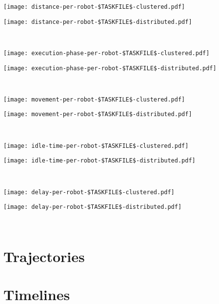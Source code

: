 \documentclass[11pt,a4paper]{article}
\begin{document}
\newpage

\noindent
\begin{minipage}{0.5\textwidth}
\texttt{[image: distance-per-robot-\$TASKFILE\$-clustered.pdf]}
\end{minipage}
\begin{minipage}{0.5\textwidth}
\texttt{[image: distance-per-robot-\$TASKFILE\$-distributed.pdf]}
\end{minipage}
\\[0.5cm]

\noindent
\begin{minipage}{0.5\textwidth}
\texttt{[image: execution-phase-per-robot-\$TASKFILE\$-clustered.pdf]}
\end{minipage}
\begin{minipage}{0.5\textwidth}
\texttt{[image: execution-phase-per-robot-\$TASKFILE\$-distributed.pdf]}
\end{minipage}
\\[0.5cm]

\noindent
\begin{minipage}{0.5\textwidth}
\texttt{[image: movement-per-robot-\$TASKFILE\$-clustered.pdf]}
\end{minipage}
\begin{minipage}{0.5\textwidth}
\texttt{[image: movement-per-robot-\$TASKFILE\$-distributed.pdf]}
\end{minipage}
\\[0.5cm]

\noindent
\begin{minipage}{0.5\textwidth}
\texttt{[image: idle-time-per-robot-\$TASKFILE\$-clustered.pdf]}
\end{minipage}
\begin{minipage}{0.5\textwidth}
\texttt{[image: idle-time-per-robot-\$TASKFILE\$-distributed.pdf]}
\end{minipage}
\\[0.5cm]

\noindent
\begin{minipage}{0.5\textwidth}
\texttt{[image: delay-per-robot-\$TASKFILE\$-clustered.pdf]}
\end{minipage}
\begin{minipage}{0.5\textwidth}
\texttt{[image: delay-per-robot-\$TASKFILE\$-distributed.pdf]}
\end{minipage}
\\[0.5cm]

\newpage

\section*{Trajectories}



\newpage

\section*{Timelines}


\end{document}
